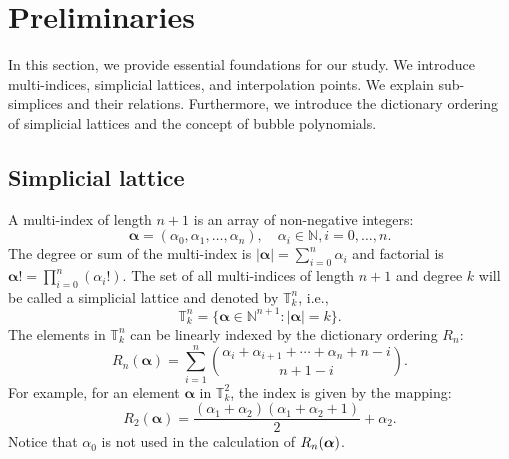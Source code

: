 \documentclass[mathpazo]{cicp}
\begin{document}
\section{Preliminaries}\label{sec:pre}
In this section, we provide essential foundations for our study. We introduce multi-indices, simplicial lattices, and interpolation points. We explain sub-simplices and their relations. Furthermore, we introduce the dictionary ordering of simplicial lattices and the concept of bubble polynomials. 

\subsection{Simplicial lattice}
A multi-index of length $n+1$ is an array of non-negative integers: 
$$
\boldsymbol\alpha = (\alpha_0, \alpha_1, \ldots, \alpha_{n}), \quad \alpha_i \in \mathbb N, i=0,\ldots, n.
$$ 
The degree or sum of the multi-index is 
$|\boldsymbol \alpha| = \sum_{i = 0}^{n} \alpha_i$ and factorial is 
$\boldsymbol \alpha! = \prod_{i=0}^n (\alpha_i!)$. 
The set of all multi-indices of length $n+1$ and degree 
$k$ will be called a simplicial lattice and denoted by $\mathbb T^n_k$, i.e.,
$$
\mathbb T^n_k = \{ \boldsymbol \alpha \in \mathbb N^{n+1}:
|\boldsymbol \alpha| = k\}.
$$ 
The elements in $\mathbb T^n_k$ can be linearly indexed by the 
dictionary ordering $R_n$:
\begin{equation*}
R_n(\boldsymbol \alpha)=\sum_{i=1}^n{\alpha_i+\alpha_{i+1}+\cdots+\alpha_n+n-i \choose n+1-i}.
\end{equation*}
For example, for an element $\boldsymbol \alpha$ in $\mathbb T^2_k$, the index is given by the mapping:
$$
R_2(\boldsymbol \alpha) = \frac{(\alpha_1+\alpha_2)(\alpha_1+\alpha_2+1)}{2} + 
\alpha_2.
$$ 
Notice that $\alpha_0$ is not used in the calculation of $R_n(\boldsymbol \alpha)$. 
 
\end{document}
